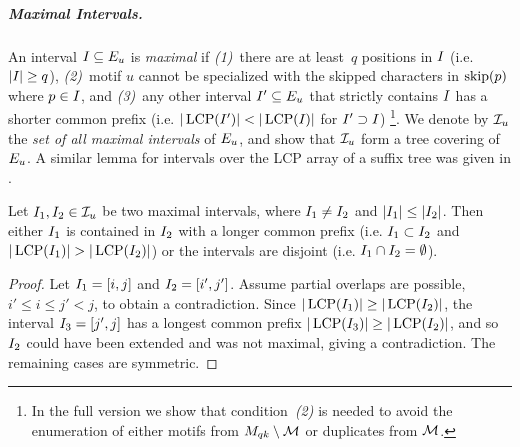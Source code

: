 \subparagraph*{Maximal Intervals.}
%
An interval $I_{} \subseteq E_{u}$ is \emph{maximal} if \emph{(1)}~there are at least~$q$ positions in $I_{}$ (i.e. $|I_{}| \geq q$), \emph{(2)}~motif $u$ cannot be specialized with the skipped characters in $\operatorname{skip}(p)$ where $p \in I_{}$, and \emph{(3)}~any other interval $I_{}' \subseteq E_{u}$ that strictly contains $I_{}$ has a shorter common prefix (i.e. $|\operatorname{LCP}(I_{}')| < |\operatorname{LCP}(I_{})|$ for $I_{}' \supset I_{}$) \footnote{%
In the full version we show that condition~\emph{(2)} is needed to avoid the enumeration of either motifs from $M_{qk} \setminus \mathcal{M}$ or duplicates from $\mathcal{M}$.}. 
We denote by $\mathcal{I}_{u}$ the \emph{set of all maximal intervals} of $E_{u}$, and show that $\mathcal{I}_{u}$ form a tree covering of $E_{u}$. A similar lemma for intervals over the LCP array of a suffix tree was given in \cite{abouelhoda2004replacing}.
\begin{lemma}
  \label{lem:intOverlap}
    Let $I_{1}, I_{2} \in \mathcal{I}_{u}$ be two maximal intervals, where $I_{1} \not = I_{2}$ and $|I_{1}| \leq  |I_{2}|$.
    Then either $I_{1}$ is contained in $I_{2}$ with a longer common prefix (i.e. $I_{1} \subset I_{2}$ and $|\operatorname{LCP}(I_{1})| > |\operatorname{LCP}(I_{2})|$) or the intervals are disjoint (i.e. $I_{1} \cap I_{2} = \emptyset$). 
\end{lemma}
\begin{proof}
    Let $I_{1} = [i, j]$ and $I_{2} = [i', j']$. 
    Assume partial overlaps are possible, $i' \leq i \leq j' < j$, to obtain a contradiction.
    Since $|\operatorname{LCP}(I_{1})| \geq |\operatorname{LCP}(I_{2})|$, the interval $I_{3} = [j', j]$ has a longest common prefix $|\operatorname{LCP}(I_{3})| \geq |\operatorname{LCP}(I_{2})|$, and so $I_{2}$ could have been extended and was not maximal, giving a contradiction. 
    The remaining cases are symmetric.
\end{proof}

